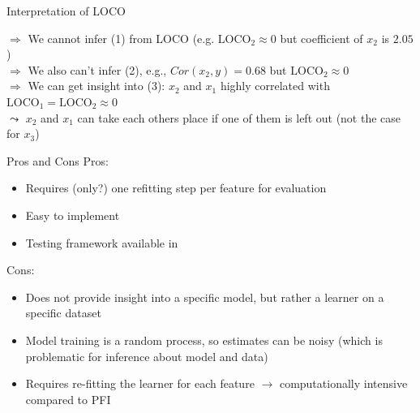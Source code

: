 \documentclass[11pt,compress,t,notes=noshow, aspectratio=169, xcolor=table]{beamer}
\begin{document}
\begin{frame}{Interpretation of LOCO}
\lz\pause

$\Rightarrow$ We cannot infer (1) from LOCO (e.g. $\text{LOCO}_2 \approx 0$ but coefficient of $x_2$ is $2.05$)\\\pause
$\Rightarrow$ We also can't infer (2), e.g., $Cor(x_2, y) = 0.68$ but $\text{LOCO}_2 \approx 0$\\\pause
$\Rightarrow$ We can get insight into (3): $x_2$ and $x_1$ highly correlated with $\text{LOCO}_1 = \text{LOCO}_2  \approx 0$ \\
\phantom{$\Rightarrow$} $\leadsto$ $x_2$ and $x_1$ can take each others place if one of them is left out (not the case for $x_3$)
\end{frame}

\begin{frame}{Pros and Cons}
  Pros:
  \begin{itemize}
    \item Requires (only?) one refitting step per feature for evaluation
    \item Easy to implement
    \item Testing framework available in 
  \end{itemize}
%
  Cons:
  \begin{itemize}
    \item Does not provide insight into a specific model, but rather a learner on a specific dataset
    \item Model training is a random process, so estimates can be noisy (which is problematic for inference about model and data)
    \item Requires re-fitting the learner for each feature $\rightarrow$ computationally intensive compared to PFI
  \end{itemize}
\end{frame}


\endlecture
\end{document}
